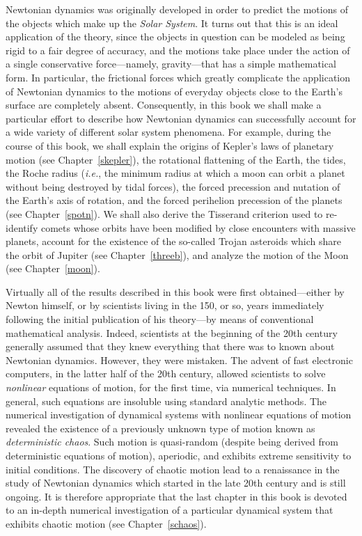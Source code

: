 Newtonian dynamics was originally developed in order to predict
the motions of the objects which make up the {\em Solar System}. It turns out that this is an
ideal application of the theory, since the objects in question can
be modeled as being rigid to a fair degree of accuracy, and the motions
take place under the action of a single conservative force---namely, gravity---that has a simple mathematical form. In particular, the frictional forces which greatly
complicate the application of Newtonian dynamics to the motions of
everyday objects close to the Earth's surface are completely absent.
Consequently, in this book  we shall make a particular effort to describe how  Newtonian dynamics
can successfully  account  for a wide variety of different solar system phenomena. For example, during the
course of this book, we shall explain the  origins of Kepler's laws
of planetary motion (see Chapter~\ref{skepler}),
the rotational flattening of the Earth, the tides,  the Roche radius ({\em i.e.}, the  minimum radius at which a moon can orbit a planet without being destroyed by tidal forces), the forced precession and nutation of the Earth's axis of rotation,
and the forced perihelion precession of the planets (see Chapter~\ref{spotn}). We
shall also derive the Tisserand criterion
used to re-identify comets whose orbits have been modified by close encounters with massive planets,  account for the existence of the so-called
Trojan asteroids which share the orbit of Jupiter (see Chapter~\ref{threeb}), and analyze the motion of the Moon (see Chapter~\ref{moon}).

Virtually all of the  results described in this book were first 
obtained---either by Newton himself, or by scientists living in the 150, or so,
years immediately following the initial publication of his theory---by means of
conventional mathematical analysis. Indeed,
scientists at the beginning of the 20th century generally assumed that
they knew everything that there was to known about
Newtonian dynamics. However, they were mistaken. The advent of
fast electronic computers, in the latter half of the 20th century, allowed
scientists to solve {\em nonlinear}\/ equations of motion, for the first time, via numerical techniques. In general, such equations are insoluble using
standard analytic methods. The numerical investigation  of dynamical systems with nonlinear equations of motion
revealed the existence of a previously unknown type of motion
known as {\em deterministic chaos}. Such motion is quasi-random (despite being derived from deterministic equations of motion),
aperiodic, and exhibits extreme sensitivity to initial conditions. The discovery of chaotic motion  lead to a  renaissance in the study of Newtonian dynamics 
which started in the late 20th century and  is still ongoing. It is therefore appropriate that the  last chapter in this book  is 
devoted to an in-depth numerical investigation of a particular dynamical
system that exhibits chaotic motion (see Chapter~\ref{schaos}).

